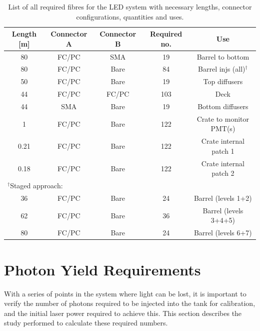 \documentclass[a4paper,11pt]{article}
\begin{document}
\begin{table}[h]
\centering
\setlength{\tabcolsep}{4pt}
\begin{tabular}{ccccc}
\toprule
Length [m]	&	Connector A	&	Connector B	&	Required no.	&	Use		\\ \midrule
80			&	FC/PC		&	SMA			&	19				&	Barrel to bottom	\\
80			&	FC/PC		&	Bare		&	84				&	Barrel injs (all)$^\dagger$	\\
50			&	FC/PC		&	Bare		&	19				&	Top diffusers \\
44			&	FC/PC		&	FC/PC		&	103				&	Deck		\\
44			&	SMA			&	Bare		&	19				&	Bottom diffusers	\\
1			&	FC/PC		&	Bare		&	122				&	Crate to monitor PMT(s)	\\
0.21		&	FC/PC		&	Bare		&	122				&	Crate internal patch 1	\\
0.18		&	FC/PC		&	Bare		&	122				&	Crate internal patch 2 \\ \midrule
\multicolumn{3}{l}{$^\dagger$Staged approach:}			&					&			\\
36			&	FC/PC		&	Bare		&	24				&	Barrel (levels 1+2) \\
62			&	FC/PC		&	Bare		&	36				&	Barrel (levels 3+4+5)	\\
80			&	FC/PC		&	Bare		&	24				&	Barrel (levels 6+7)	\\
\bottomrule
\end{tabular}
\caption{List of all required fibres for the LED system with necessary lengths, connector configurations, quantities and uses.}\label{tab:fibreSummaryLED}
\end{table}



\clearpage

\section{Photon Yield Requirements}\label{sec:photonreq}

With a series of points in the system where light can be lost, it is important to verify the number of photons required to be injected into the tank for calibration, and the initial laser power required to achieve this. This section describes the study performed to calculate these required numbers.
\end{document}
